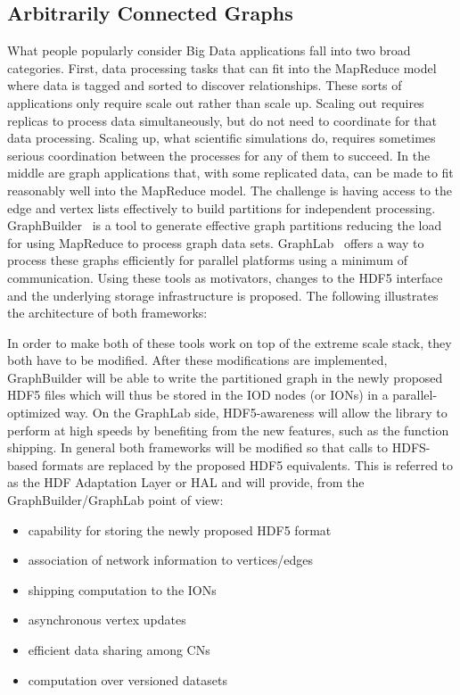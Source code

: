 \documentclass[conference]{IEEEtran} \pdfpagewidth=8.5in
\begin{document}
\subsection{Arbitrarily Connected Graphs}
\label{sec:acg}

What people popularly consider Big Data applications fall into two broad
categories. First, data processing tasks that can fit into the MapReduce model
where data is tagged and sorted to discover relationships. These sorts of
applications only require scale out rather than scale up. Scaling out requires
replicas to process data simultaneously, but do not need to coordinate for that
data processing. Scaling up, what scientific simulations do, requires sometimes
serious coordination between the processes for any of them to succeed. In the
middle are graph applications that, with some replicated data, can be made to
fit reasonably well into the MapReduce model. The challenge is having access to
the edge and vertex lists effectively to build partitions for independent
processing. GraphBuilder~\cite{Jain:2013:GraphBuilder} is a tool to generate
effective graph partitions reducing the load for using MapReduce to process
graph data sets. GraphLab~\cite{Low:2012:GraphLab} offers a way to process
these graphs efficiently for parallel platforms using a minimum of
communication. Using these tools as motivators, changes to the HDF5 interface
and the underlying storage infrastructure is proposed.  The following
illustrates the architecture of both frameworks:

In order to make both of these tools work on top of the extreme scale stack,
they both have to be modified. After these modifications are implemented,
GraphBuilder will be able to write the partitioned graph in the newly proposed
HDF5 files which will thus be stored in the IOD nodes (or IONs) in a
parallel-optimized way. On the GraphLab side, HDF5-awareness will allow
the library to perform at high speeds by benefiting from the new
features, such as the function shipping. In general both frameworks will be
modified so that calls to HDFS-based formats are replaced by the proposed HDF5
equivalents. This is referred to as the HDF Adaptation Layer or HAL and will
provide, from the GraphBuilder/GraphLab point of view:

\begin{itemize}
\item
  capability for storing the newly proposed HDF5 format
\item
  association of network information to vertices/edges
\item
  shipping computation to the IONs
\item
  asynchronous vertex updates
\item
  efficient data sharing among CNs
\item
  computation over versioned datasets
\end{itemize}
\end{document}

